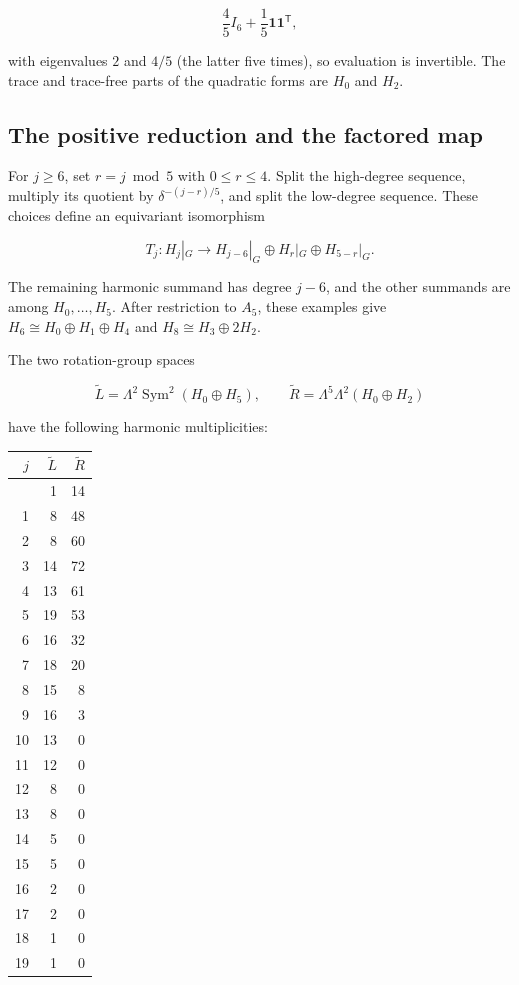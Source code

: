 \documentclass[11pt,a4paper]{article}
\begin{document}
\[
\frac45 I_6+\frac15\mathbf 1\mathbf 1^{\mathsf T},
\]

with eigenvalues \(2\) and \(4/5\) (the latter five times), so evaluation is invertible. The trace and trace-free parts of the quadratic forms are \(H_0\) and \(H_2\).

\subsection{The positive reduction and the factored map}\label{subsec:F3}

For \(j\ge6\), set \(r=j\bmod5\) with \(0\le r\le4\). Split the high-degree sequence, multiply its quotient by \(\delta^{-(j-r)/5}\), and split the low-degree sequence. These choices define an equivariant isomorphism

\[
T_j:H_j|_G\longrightarrow
H_{j-6}|_G\oplus H_r|_G\oplus H_{5-r}|_G.
\]

The remaining harmonic summand has degree \(j-6\), and the other summands are among \(H_0,\ldots,H_5\). After restriction to \(A_5\), these examples give \(H_6\cong H_0\oplus H_1\oplus H_4\) and \(H_8\cong H_3\oplus2H_2\).

The two rotation-group spaces

\[
\widetilde L=\Lambda^2\operatorname{Sym}^2(H_0\oplus H_5),\qquad
\widetilde R=\Lambda^5\Lambda^2(H_0\oplus H_2)
\]

have the following harmonic multiplicities:

{\small
\begin{longtable}[]{@{}rrr@{}}
\toprule\noalign{}
\(j\) & \(\widetilde L\) & \(\widetilde R\) \\
\midrule\noalign{}
\endhead
\bottomrule\noalign{}
\endlastfoot
0 & 1 & 14 \\
1 & 8 & 48 \\
2 & 8 & 60 \\
3 & 14 & 72 \\
4 & 13 & 61 \\
5 & 19 & 53 \\
6 & 16 & 32 \\
7 & 18 & 20 \\
8 & 15 & 8 \\
9 & 16 & 3 \\
10 & 13 & 0 \\
11 & 12 & 0 \\
12 & 8 & 0 \\
13 & 8 & 0 \\
14 & 5 & 0 \\
15 & 5 & 0 \\
16 & 2 & 0 \\
17 & 2 & 0 \\
18 & 1 & 0 \\
19 & 1 & 0 \\
\end{longtable}
}
\end{document}
